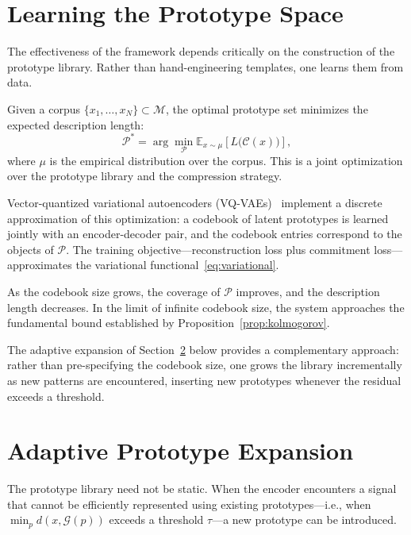 \documentclass[12pt,a4paper]{article}
\theoremstyle{definition}
\theoremstyle{remark}
\begin{document}
\section{Learning the Prototype Space}
\label{sec:learning}

The effectiveness of the framework depends critically on the construction of the prototype library. Rather than hand-engineering templates, one learns them from data.

Given a corpus $\{x_1, \dots, x_N\} \subset \mathcal{M}$, the optimal prototype set minimizes the expected description length:
\[
\mathcal{P}^* = \arg\min_{\mathcal{P}} \mathbb{E}_{x \sim \mu} \left[ L\big(\mathcal{C}(x)\big) \right],
\]
where $\mu$ is the empirical distribution over the corpus. This is a joint optimization over the prototype library and the compression strategy.

Vector-quantized variational autoencoders (VQ-VAEs)~\cite{vqvae} implement a discrete approximation of this optimization: a codebook of latent prototypes is learned jointly with an encoder-decoder pair, and the codebook entries correspond to the objects of $\mathcal{P}$. The training objective---reconstruction loss plus commitment loss---approximates the variational functional~\eqref{eq:variational}.

As the codebook size grows, the coverage of $\mathcal{P}$ improves, and the description length decreases. In the limit of infinite codebook size, the system approaches the fundamental bound established by Proposition~\ref{prop:kolmogorov}.

The adaptive expansion of Section~\ref{sec:adaptive} below provides a complementary approach: rather than pre-specifying the codebook size, one grows the library incrementally as new patterns are encountered, inserting new prototypes whenever the residual exceeds a threshold.

\section{Adaptive Prototype Expansion}
\label{sec:adaptive}

The prototype library need not be static. When the encoder encounters a signal that cannot be efficiently represented using existing prototypes---i.e., when $\min_p d(x, \mathcal{G}(p))$ exceeds a threshold $\tau$---a new prototype can be introduced.
\end{document}
